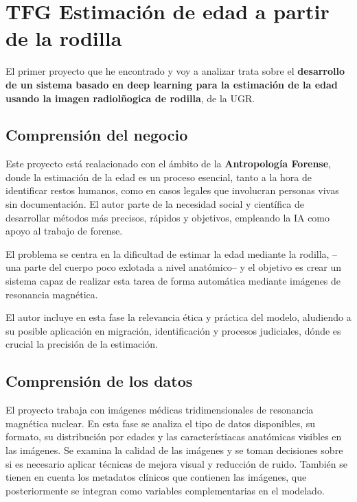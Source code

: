 \documentclass{../../../miPlantilla}
\begin{document}
\maketitle

\section{TFG Estimación de edad a partir de la rodilla}
El primer proyecto que he encontrado y voy a analizar trata sobre el \textbf{desarrollo de un
sistema basado en deep learning para la estimación de la edad usando la imagen radiolñogica
de rodilla}, de la UGR.

\subsection{Comprensión del negocio}
Este proyecto está realacionado con el ámbito de la \textbf{Antropología Forense}, donde la
estimación de la edad es un proceso esencial, tanto a la hora de identificar restos humanos,
como en casos legales que involucran personas vivas sin documentación. El autor parte de la
necesidad social y científica de desarrollar métodos más precisos, rápidos y objetivos, 
empleando la IA como apoyo al trabajo de forense. 

El problema se centra en la dificultad de estimar la edad mediante la rodilla, --una parte
del cuerpo poco exlotada a nivel anatómico-- y el objetivo es crear un sistema capaz de
realizar esta tarea de forma automática mediante imágenes de resonancia magnética. 

El autor incluye en esta fase la relevancia ética y práctica del modelo, aludiendo a su 
posible aplicación en migración, identificación y procesos judiciales, dónde es crucial la
precisión de la estimación.

\subsection{Comprensión de los datos}
El proyecto trabaja con imágenes médicas tridimensionales de resonancia magnética nuclear.
En esta fase se analiza el tipo de datos disponibles, su formato, su distribución por edades
y las característiacas anatómicas visibles en las imágenes. Se examina la calidad de las 
imágenes y se toman decisiones sobre si es necesario aplicar técnicas de mejora visual y 
reducción de ruido. También se tienen en cuenta los metadatos clínicos que contienen las
imágenes, que posteriormente se integran como variables complementarias en el modelado.
\end{document}
